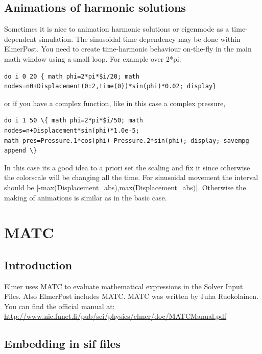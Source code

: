 \subsection{Animations of harmonic solutions}

Sometimes it is nice to animation harmonic solutions or eigenmode as a time-dependent simulation. The sinusoidal time-dependency may be done within ElmerPost. You need to create time-harmonic behaviour on-the-fly in the main math window using a small loop. For example over 2*pi:

\begin{verbatim}
do i 0 20 { math phi=2*pi*$i/20; math 
nodes=n0+Displacement(0:2,time(0))*sin(phi)*0.02; display}
\end{verbatim}

or if you have a complex function, like in this case a complex pressure,

\begin{verbatim}
do i 1 50 \{ math phi=2*pi*$i/50; math nodes=n+Displacement*sin(phi)*1.0e-5; 
math pres=Pressure.1*cos(phi)-Pressure.2*sin(phi); display; savempg append \}
\end{verbatim}

In this case its a good idea to a priori set the scaling and fix it since otherwise the colorscale will be changing all the time. For sinusoidal movement the interval should be [-max(Displacement\_abs),max(Displacement\_abs)]. Otherwise the making of animations is similar as in the basic case.


\section{MATC}

\subsection{Introduction}

Elmer uses MATC to evaluate mathematical expressions in the Solver Input Files. Also ElmerPost includes MATC.  MATC was written by Juha Ruokolainen.  You can find the official manual at:\\

\url{http://www.nic.funet.fi/pub/sci/physics/elmer/doc/MATCManual.pdf}

\subsection{Embedding in sif files}

